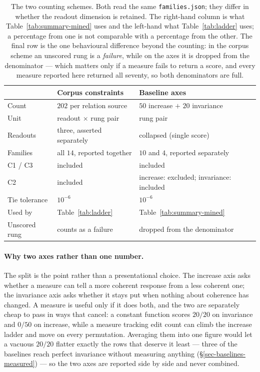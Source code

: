 \begin{table}[htbp]
\centering\small
\caption{The two counting schemes. Both read the same \texttt{families.json}; they differ in whether the
  readout dimension is retained. The right-hand column is what Table~\ref{tab:summary-mined} uses and the
  left-hand what Table~\ref{tab:ladder} uses; a percentage from one is not comparable with a percentage
  from the other. The final row is the one behavioural difference beyond the counting: in the corpus
  scheme an unscored rung is a \emph{failure}, while on the axes it is dropped from the denominator ---
  which matters only if a measure fails to return a score, and every measure reported here returned all
  seventy, so both denominators are full.}
\label{tab:axes-compare}
\begin{tabular}{@{}lll@{}}
\toprule
& Corpus constraints & Baseline axes \\
\midrule
Count              & $202$ per relation source & $50$ increase $+$ $20$ invariance \\
Unit               & readout $\times$ rung pair & rung pair \\
Readouts           & three, asserted separately & collapsed (single score) \\
Families           & all $14$, reported together & $10$ and $4$, reported separately \\
C1 / C3            & included & included \\
C2                 & included & increase: excluded; invariance: included \\
Tie tolerance      & $10^{-6}$ & $10^{-6}$ \\
Used by            & Table~\ref{tab:ladder} & Table~\ref{tab:summary-mined} \\
Unscored rung      & counts as a failure & dropped from the denominator \\
\bottomrule
\end{tabular}
\end{table}

\paragraph{Why two axes rather than one number.} The split is the point rather than a presentational
choice. The increase axis asks whether a measure can tell a more coherent response from a less coherent
one; the invariance axis asks whether it stays put when nothing about coherence has changed. A measure
is useful only if it does both, and the two are separately cheap to pass in ways that cancel: a constant
function scores $20/20$ on invariance and $0/50$ on increase, while a measure tracking edit count can
climb the increase ladder and move on every permutation. Averaging them into one figure would let a
vacuous $20/20$ flatter exactly the rows that deserve it least --- three of the baselines reach perfect
invariance without measuring anything (\S\ref{sec-baselines-measured}) --- so the two axes are reported
side by side and never combined.

